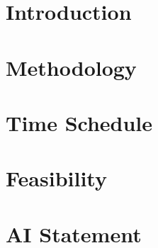 \documentclass[11pt]{article}
\begin{document}
\BgThispage


\newpage
\tableofcontents

\newpage
\section{Introduction}


\section{Methodology}


\section{Time Schedule}


\section{Feasibility}


\section{AI Statement}


\newpage

\end{document}
